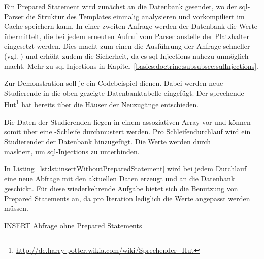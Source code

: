 Ein Prepared Statement wird zunächst an die Datenbank gesendet, wo der \gls{sql}-Parser die Struktur des Templates einmalig analysieren und vorkompiliert im Cache speichern kann. In einer zweiten Anfrage werden der Datenbank die Werte übermittelt, die bei jedem erneuten Aufruf vom Parser anstelle der Platzhalter eingesetzt werden. Dies macht zum einen die Ausführung der Anfrage schneller (vgl. \cite[S. 75]{book:popel2007pdo}) und erhöht zudem die Sicherheit, da es \gls{sql}-Injections nahezu unmöglich macht. Mehr zu \gls{sql}-Injections in Kapitel~\ref{basics:doctrine:subsubsec:sqlInjections}.

Zur Demonstration soll je ein Codebeispiel dienen. Dabei werden neue Studierende in die oben gezeigte Datenbanktabelle eingefügt. Der sprechende Hut\footnote{\url{http://de.harry-potter.wikia.com/wiki/Sprechender_Hut}} hat bereits über die Häuser der Neuzugänge entschieden.

Die Daten der Studierenden liegen in einem assoziativen Array vor und können somit über eine -Schleife durchmustert werden. Pro Schleifendurchlauf wird ein Studierender der Datenbank hinzugefügt. Die Werte werden durch\\
 maskiert, um \gls{sql}-Injections zu unterbinden.

In Listing~\ref{lst:lst:insertWithoutPreparedStatement} wird bei jedem Durchlauf eine neue Abfrage mit den aktuellen Daten erzeugt und an die Datenbank geschickt. Für diese wiederkehrende Aufgabe bietet sich die Benutzung von Prepared Statements an, da pro Iteration lediglich die Werte angepasst werden müssen.

\begin{listing}[H]
\caption{INSERT Abfrage ohne Prepared Statements}
\label{lst:insertWithoutPreparedStatement}
\end{listing}

